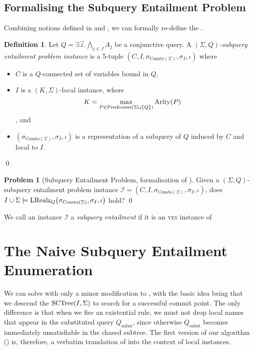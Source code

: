 \documentclass[12pt]{report}
\theoremstyle{plain}
\theoremstyle{definition}
\newtheorem{problem}[theorem]{Problem}
\newtheorem{definition}[theorem]{Definition}
\def\Consts{{\mathrm{Consts}}}
\def\Predicates{{\mathrm{Predicates}}}
\newcommand{\Arity}[1]{\ensuremath{\normalfont{\operatorname{Arity}}\!\left( #1 \right)}}
\newcommand{\SCTree}[2]{\ensuremath{\normalfont{\textrm{SCTree}}\!\left( #1, #2 \right)}}
\newcommand{\LRealz}[2]{\ensuremath{\normalfont{\textrm{LRealz}}_{ #1 }\!\left( #2 \right)}}
\begin{document}
\subsection{Formalising the Subquery Entailment Problem}

Combining notions defined in  and , we can formally re-define the .

\begin{definition}
  Let $Q = \exists \vec{z}. \bigwedge_{j \in J} A_j$ be a conjunctive query. A \emph{$(\Sigma, Q)$-subquery entailment problem instance} is a 5-tuple $(C, I, \sigma_{\Consts(\Sigma)}, \sigma_I, \iota)$ where
  \begin{itemize}
    \item $C$ is a $Q$-connected set of variables bound in $Q$,
    \item $I$ is a $(K, \Sigma)$-local instance, where $$K = \max_{P \in \Predicates(\Sigma \cup \{Q\})} \Arity{P}$$, and
    \item $(\sigma_{\Consts(\Sigma)}, \sigma_I, \iota)$ is a representation of a subquery of $Q$ induced by $C$ and local to $I$.
  \end{itemize}
  \qed
\end{definition}

\begin{problem}[Subquery Entailment Problem, formalisation of ]
\label{problem:subquery-entailment}
  Given a $(\Sigma, Q)$-subquery entailment problem instance $\mathcal{I} = (C, I, \sigma_{\Consts(\Sigma)}, \sigma_I, \iota)$, does $I \cup \Sigma \models \LRealz{Q}{\sigma_{\Consts(\Sigma)}, \sigma_I, \iota}$ hold?
  \qed
\end{problem}

We call an instance $\mathcal{I}$ a \emph{subquery entailment} if it is an \textsc{yes} instance of 

\section{The Naive Subquery Entailment Enumeration}
\label{section:naive-subquery-entailment-enumeration}

We can solve  with only a minor modification to , with the basic idea being that we descend the $\SCTree{I}{\Sigma}$ to search for a successful commit point. The only difference is that when we fire an existential rule, we must not drop local names that appear in the substituted query $Q_\mathrm{subst}$, since otherwise $Q_\mathrm{subst}$ becomes immediately unsatisfiable in the chased subtree. The first version of our algorithm () is, therefore, a verbatim translation of  into the context of local instances.
\end{document}
